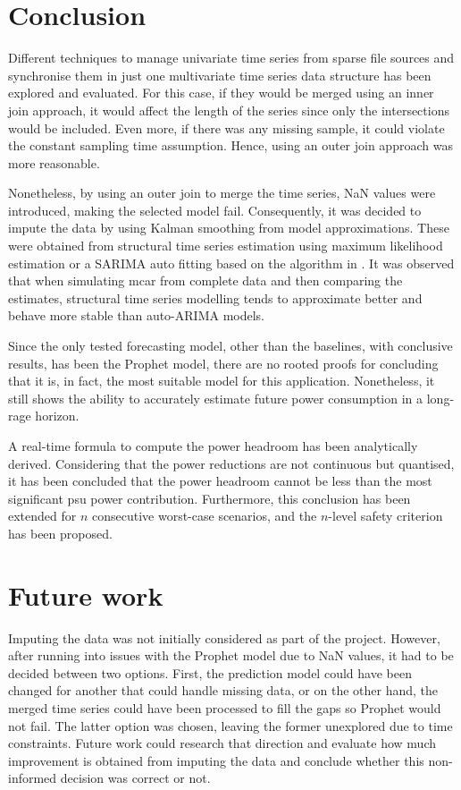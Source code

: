 \chapter{Conclusion}
\label{cha:conclusion}

Different techniques to manage univariate time series from sparse file sources and synchronise them in just one multivariate time series data structure has been explored and evaluated. For this case, if they would be merged using an inner join approach, it would affect the length of the series since only the intersections would be included. Even more, if there was any missing sample, it could violate the constant sampling time assumption. Hence, using an outer join approach was more reasonable. 

Nonetheless, by using an outer join to merge the time series, NaN values were introduced, making the selected model fail. Consequently, it was decided to impute the data by using Kalman smoothing from model approximations. These were obtained from structural time series estimation using maximum likelihood estimation or a SARIMA auto fitting based on the algorithm in \cite{autoarimaLib}. It was observed that when simulating \ac{mcar} from complete data and then comparing the estimates, structural time series modelling tends to approximate better and behave more stable than auto-ARIMA models.

Since the only tested forecasting model, other than the baselines, with conclusive results, has been the Prophet model, there are no rooted proofs for concluding that it is, in fact, the most suitable model for this application. Nonetheless, it still shows the ability to accurately estimate future power consumption in a long-rage horizon.

A real-time formula to compute the power headroom has been analytically derived. Considering that the power reductions are not continuous but quantised, it has been concluded that the power headroom cannot be less than the most significant \ac{psu} power contribution. Furthermore, this conclusion has been extended for $n$ consecutive worst-case scenarios, and the $n$-level safety criterion has been proposed.

\chapter{Future work}
\label{cha:future-work}

Imputing the data was not initially considered as part of the project. However, after running into issues with the Prophet model due to NaN values, it had to be decided between two options. First, the prediction model could have been changed for another that could handle missing data, or on the other hand, the merged time series could have been processed to fill the gaps so Prophet would not fail. The latter option was chosen, leaving the former unexplored due to time constraints. Future work could research that direction and evaluate how much improvement is obtained from imputing the data and conclude whether this non-informed decision was correct or not. 

